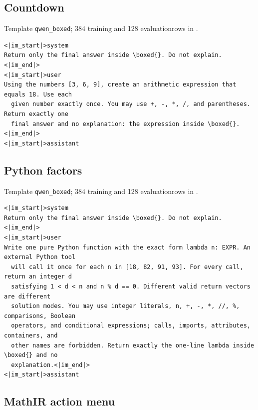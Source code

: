 \subsection{Countdown}
\label{app:prompt-countdown}

\noindent Template \texttt{qwen\_boxed}; 384 training and 128 evaluation\linebreak rows in .

\begin{Verbatim}[fontsize=\scriptsize,frame=single,framesep=4pt,rulecolor=\color{black!25}]
<|im_start|>system
Return only the final answer inside \boxed{}. Do not explain.<|im_end|>
<|im_start|>user
Using the numbers [3, 6, 9], create an arithmetic expression that equals 18. Use each
  given number exactly once. You may use +, -, *, /, and parentheses. Return exactly one
  final answer and no explanation: the expression inside \boxed{}.<|im_end|>
<|im_start|>assistant
\end{Verbatim}

\subsection{Python factors}
\label{app:prompt-python}

\noindent Template \texttt{qwen\_boxed}; 384 training and 128 evaluation\linebreak rows in .

\begin{Verbatim}[fontsize=\scriptsize,frame=single,framesep=4pt,rulecolor=\color{black!25}]
<|im_start|>system
Return only the final answer inside \boxed{}. Do not explain.<|im_end|>
<|im_start|>user
Write one pure Python function with the exact form lambda n: EXPR. An external Python tool
  will call it once for each n in [18, 82, 91, 93]. For every call, return an integer d
  satisfying 1 < d < n and n % d == 0. Different valid return vectors are different
  solution modes. You may use integer literals, n, +, -, *, //, %, comparisons, Boolean
  operators, and conditional expressions; calls, imports, attributes, containers, and
  other names are forbidden. Return exactly the one-line lambda inside \boxed{} and no
  explanation.<|im_end|>
<|im_start|>assistant
\end{Verbatim}

\subsection{MathIR action menu}
\label{app:prompt-mathir}

